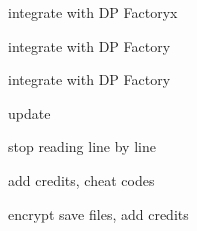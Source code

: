 
\begin{DoxyRefList}
\item[\label{todo__todo000001}%
\hypertarget{todo__todo000001}{}%
Class \hyperlink{class_b___movable}{B\+\_\+\+Movable} ]integrate with D\+P Factoryx  
\item[\label{todo__todo000005}%
\hypertarget{todo__todo000005}{}%
Class \hyperlink{class_e___renard}{E\+\_\+\+Renard} ]integrate with D\+P Factory  
\item[\label{todo__todo000006}%
\hypertarget{todo__todo000006}{}%
Class \hyperlink{class_ennemi}{Ennemi} ]integrate with D\+P Factory  
\item[\label{todo__todo000007}%
\hypertarget{todo__todo000007}{}%
Class \hyperlink{class_gameboard}{Gameboard} ]update  
\item[\label{todo__todo000008}%
\hypertarget{todo__todo000008}{}%
Class \hyperlink{class_level}{Level} ]stop reading line by line  
\item[\label{todo__todo000010}%
\hypertarget{todo__todo000010}{}%
Class \hyperlink{class_m___pause}{M\+\_\+\+Pause} ]add credits, cheat codes  
\item[\label{todo__todo000009}%
\hypertarget{todo__todo000009}{}%
Class \hyperlink{class_menu_start}{Menu\+Start} ]encrypt save files, add credits 
\end{DoxyRefList}
